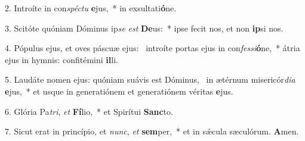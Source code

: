 2. Introíte in con\textit{spéc}\textit{tu} \textbf{e}jus,~*  in exsultati\textbf{ó}ne.\

3. Scitóte quóniam Dóminus ip\textit{se} \textit{est} \textbf{De}us:~*  ipse fecit nos, et non \textbf{ip}si nos.\

4. Pópulus ejus, et oves páscuæ ejus: \dag\  introíte portas ejus in con\textit{fes}\textit{si}\textbf{ó}ne,~*  átria ejus in hymnis: confitémini \textbf{il}li.\

5. Laudáte nomen ejus: quóniam suávis est Dóminus, \dag\  in ætérnum misericór\textit{di}\textit{a} \textbf{e}jus,~*  et usque in generatiónem et generatiónem véritas \textbf{e}jus.\

6. Glória Pa\textit{tri}, \textit{et} \textbf{Fí}lio,~*  et Spirítui \textbf{Sanc}to.\

7. Sicut erat in princípio, et \textit{nunc}, \textit{et} \textbf{sem}per,~*  et in sǽcula sæculórum. \textbf{A}men.\

